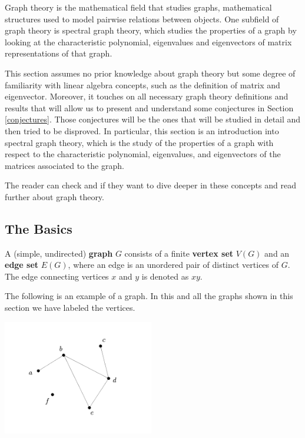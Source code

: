 \documentclass[11pt]{article}
\theoremstyle{definition}
\begin{document}
Graph theory is the mathematical field that studies graphs, mathematical structures used to model pairwise relations between objects. One subfield of graph theory is spectral graph theory, which studies the properties of a graph by looking at the characteristic polynomial, eigenvalues and eigenvectors of matrix representations of that graph. 

This section assumes no prior knowledge about graph theory but some degree of familiarity with linear algebra concepts, such as the definition of matrix and eigenvector. Moreover, it touches on all necessary graph theory definitions and results that will allow us to present and understand some conjectures in Section \ref{conjectures}. Those conjectures will be the ones that will be studied in detail and then tried to be disproved. In particular, this section is an introduction into spectral graph theory, which is the study of the properties of a graph with respect to the characteristic polynomial, eigenvalues, and eigenvectors of the matrices associated to the graph.

The reader can check \cite{Godsil:2001} and \cite{BrouwerHaemers:2011} if they want to dive deeper in these concepts and read further about graph theory. 

\subsection{The Basics}

A (simple, undirected) \textbf{graph} $G$ consists of a finite \textbf{vertex set} $V(G)$ and an \textbf{edge set} $E(G)$, where an edge is an unordered pair of distinct vertices of $G$. The edge connecting vertices $x$ and $y$ is denoted as $xy$. 

The following is an example of a graph. In this and all the graphs shown in this section we have labeled the vertices.

\begin{center}
    \centering
    \includegraphics[width=\textwidth, height=5cm, keepaspectratio=true]{images/graph.jpeg}
    \label{fig:graph}
\end{center}
\end{document}
